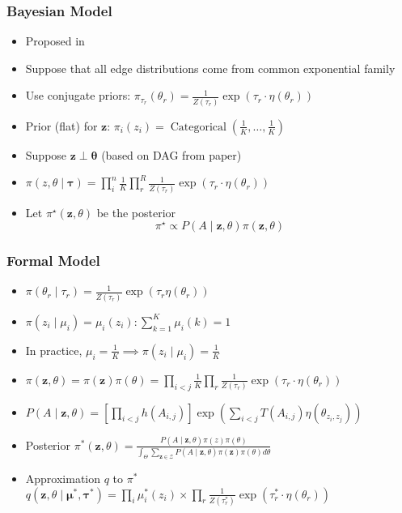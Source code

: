 \documentclass{beamer}
\newcommand{\1}{\mathbbm{1}}
\newcommand{\V}[1]{\ensuremath{\boldsymbol{#1}}} %
\newcommand{\M}[1]{\ensuremath{#1}} %
\begin{document}
\begin{frame}
  \frametitle{Bayesian Model}
  \begin{itemize}
  \item Proposed in \parencite{aicher_adapting_2013,aicher_learning_2015} 
  \item Suppose that all edge distributions come from common exponential family
  \item Use conjugate priors: $\pi_{\tau_r}(\theta_r) = \frac{1}{Z(\tau_r)} \exp(\tau_r \cdot  \eta(\theta_r))$
  \item Prior (flat) for $\V{z}$: $\pi_i(z_i) = \operatorname{Categorical}\left( \frac{1}{K}, \ldots, \frac{1}{K} \right)$
  \item Suppose $\V{z} \perp \V{\theta}$ (based on DAG from paper)
  \item $\pi(z, \theta \mid \V{\tau}) = \prod_i^n \frac{1}{K} \prod_r^R \frac{1}{Z(\tau_r)} \exp( \tau_r \cdot \eta(\theta_r))$
  \item Let $\pi^{\star}(\V{z}, \M{\theta})$ be the posterior
    \begin{equation*}
      \pi^{\star} \propto P(A \mid \V{z}, \M{\theta}) \pi(\V{z}, \M{\theta})
    \end{equation*}

  \end{itemize}
\end{frame}

\begin{frame}
  \frametitle{Formal Model}
  \begin{itemize}
  \item $\pi(\theta_r \mid \tau_r) = \frac{1}{Z(\tau_r)} \exp( \tau_r \eta(\theta_r))$
  \item $\pi(z_i \mid \mu_i) = \mu_i(z_i): \sum_{k=1}^K \mu_i(k) = 1$
  \item In practice, $\mu_i = \frac{1}{K} \implies \pi(z_i \mid \mu_i) = \frac{1}{K}$
  \item $\pi(\V{z},\M{\theta}) = \pi(\V{z}) \pi(\M{\theta}) = \prod_{i<j} \frac{1}{K} \prod_r \frac{1}{Z(\tau_r)} \exp(\tau_r \cdot \eta(\theta_r))$
  \item $P(A \mid \V{z}, \theta) = \left[ \prod_{i < j}  h(A_{i,j}) \right] \exp( \sum_{i < j} T(A_{i,j}) \eta(\theta_{z_i,z_j}) )$
  \item Posterior $\pi^{*}(\V{z},\M{\theta}) = \frac{P(\M{A} \mid \V{z},\M{\theta}) \pi(z) \pi(\theta)}{\int_{\Theta} \sum_{\V{z} \in \mathcal{Z}} P(\M{A} \mid \V{z}, \M{\theta}) \pi(\V{z}) \pi(\M{\theta}) d \theta}$
  \item Approximation $q$ to $\pi^{*}$ $q(\V{z}, \theta \mid \V{\mu^{*}}, \V{\tau^{*}}) = \prod_i \mu_i^{*}(z_i) \times \prod_r \frac{1}{Z(\tau_r^{*})} \exp( \tau_r^{*} \cdot \eta(\theta_r))$
  \end{itemize}
\end{frame}
\end{document}
